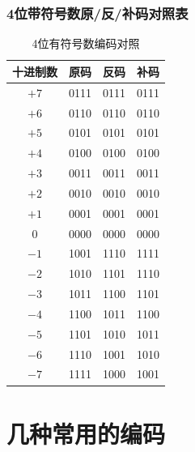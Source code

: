 \subsubsection{4位带符号数原/反/补码对照表}
\begin{table}[!htbp]
    \centering
    \setlength{\tabcolsep}{6pt}
    \renewcommand{\arraystretch}{1.2}
    \caption{4位有符号数编码对照}
    \label{tab:4bit_code}
    \begin{tabular}{|c|c|c|c|}
        \hline
        十进制数 & 原码 & 反码 & 补码 \\
        \hline
        $+7$ & 0111 & 0111 & 0111 \\
        $+6$ & 0110 & 0110 & 0110 \\
        $+5$ & 0101 & 0101 & 0101 \\
        $+4$ & 0100 & 0100 & 0100 \\
        $+3$ & 0011 & 0011 & 0011 \\
        $+2$ & 0010 & 0010 & 0010 \\
        $+1$ & 0001 & 0001 & 0001 \\
        $0$   & 0000 & 0000 & 0000 \\
        $-1$  & 1001 & 1110 & 1111 \\
        $-2$  & 1010 & 1101 & 1110 \\
        $-3$  & 1011 & 1100 & 1101 \\
        $-4$  & 1100 & 1011 & 1100 \\
        $-5$  & 1101 & 1010 & 1011 \\
        $-6$  & 1110 & 1001 & 1010 \\
        $-7$  & 1111 & 1000 & 1001 \\
        \hline
    \end{tabular}
\end{table}

\section{几种常用的编码}
